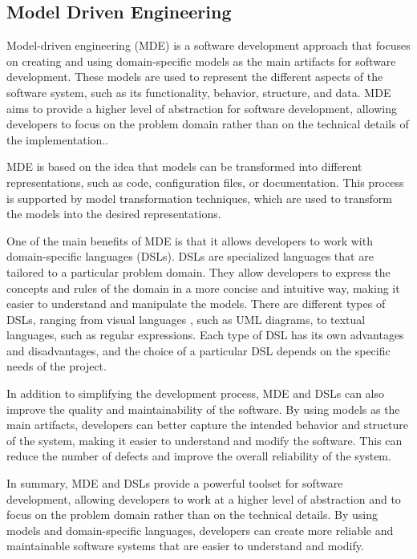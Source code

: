 \subsection{Model Driven Engineering}
Model-driven engineering (MDE) is a software development approach that focuses on creating and using domain-specific models as the main artifacts for software development. These models are used to represent the different aspects of the software system, such as its functionality, behavior, structure, and data. MDE aims to provide a higher level of abstraction for software development, allowing developers to focus on the problem domain rather than on the technical details of the implementation\cite{methodologyBasedMDE}..

MDE is based on the idea that models can be transformed into different representations, such as code, configuration files, or documentation. This process is supported by model transformation techniques, which are used to transform the models into the desired representations.

One of the main benefits of MDE is that it allows developers to work with domain-specific languages (DSLs). DSLs are specialized languages that are tailored to a particular problem domain. They allow developers to express the concepts and rules of the domain in a more concise and intuitive way, making it easier to understand and manipulate the models.
There are different types of DSLs, ranging from visual languages \cite{designDSLandIDEforIOTa}, such as UML diagrams, to textual languages, such as regular expressions. Each type of DSL has its own advantages and disadvantages, and the choice of a particular DSL depends on the specific needs of the project.

In addition to simplifying the development process, MDE and DSLs can also improve the quality and maintainability of the software. By using models as the main artifacts, developers can better capture the intended behavior and structure of the system\cite{MDE4IOT}, making it easier to understand and modify the software. This can reduce the number of defects and improve the overall reliability of the system.

In summary, MDE and DSLs provide a powerful toolset for software development, allowing developers to work at a higher level of abstraction and to focus on the problem domain rather than on the technical details. By using models and domain-specific languages, developers can create more reliable and maintainable software systems that are easier to understand and modify.

